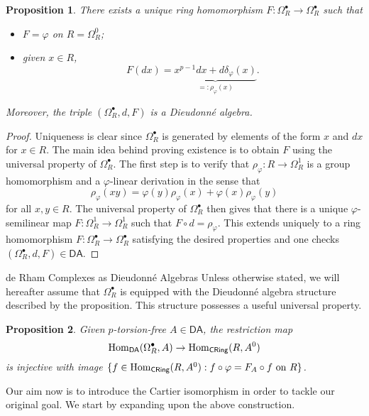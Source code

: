 \documentclass[aspectratio=1610]{beamer}
\newcommand{\DA}{\mathsf{DA}}
\renewcommand{\phi}{\varphi}
\newtheorem{proposition}{Proposition}
\begin{document}
\begin{frame}
\begin{proposition}
There exists a unique ring homomorphism $F: \Omega_R^{\bullet}\to\Omega_R^{\bullet}$ such that
\begin{itemize}
\item $F=\phi$ on $R=\Omega_R^0$;

\item given $x\in R$,
$$F(dx)=\underbrace{x^{p-1}dx+d\delta_{\phi}(x)}_{=:\rho_{\phi}(x)}.$$
\end{itemize}
Moreover, the triple $(\Omega_R^{\bullet},d,F)$ is a Dieudonn\'{e} algebra.
\end{proposition}

\begin{proof}
Uniqueness is clear since $\Omega_R^{\bullet}$ is generated by elements of the form $x$ and $dx$ for $x\in R$. The main idea behind proving existence is to obtain $F$ using the universal property of $\Omega_R^{\bullet}$. The first step is to verify that $\rho_{\phi}: R\to\Omega_R^1$ is a group homomorphism and a $\phi$-linear derivation in the sense that
$$\rho_{\phi}(xy)=\phi(y)\rho_{\phi}(x)+\phi(x)\rho_{\phi}(y)$$
for all $x,y\in R$. The universal property of $\Omega_R^{\bullet}$ then gives that there is a unique $\phi$-semilinear map $F: \Omega_R^1\to\Omega_R^1$ such that $F\circ d=\rho_{\phi}$. This extends uniquely to a ring homomorphism $F: \Omega_R^{\bullet}\to\Omega_R^{\bullet}$ satisfying the desired properties and one checks $(\Omega_R^{\bullet},d,F)\in\DA$.
\end{proof}
\end{frame}

\begin{frame}{de Rham Complexes as Dieudonn\'{e} Algebras}
Unless otherwise stated, we will hereafter assume that $\Omega_R^{\bullet}$ is equipped with the Dieudonn\'{e} algebra structure described by the proposition. This structure possesses a useful universal property.

\begin{proposition}
Given $p$-torsion-free $A\in\DA$, the restriction map
$$\Hom_{\DA}(\Omega_R^{\bullet},A)\to\Hom_{\CRing}(R,A^0)$$
is injective with image $\{f\in\Hom_{\CRing}(R,A^0) : f\circ\phi=F_A\circ f\textrm{ on }R\}$.
\end{proposition}

Our aim now is to introduce the Cartier isomorphism in order to tackle our original goal. We start by expanding upon the above construction.
\end{frame}
\end{document}
